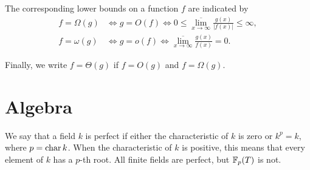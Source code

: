 The corresponding lower bounds on a function $f$ are indicated by 
\[
\begin{aligned}
f = \Omega(g) &\Longleftrightarrow g = O(f)  \Longleftrightarrow 
0 \le \overline{\lim_{x\rightarrow \infty}} \frac{g(x)}{|f(x)|} \le \infty,\\
f = \omega(g) &\Longleftrightarrow g = o(f) \Longleftrightarrow 
\overline{\lim_{x\rightarrow \infty}} \frac{g(x)}{f(x)} = 0.
\end{aligned}
\]

Finally, we write $f = \Theta(g)$ if $f = O(g)$ and $f = \Omega(g)$.

\section{Algebra}
\label{Back:Algebra:Sec}

We say that a field $k$ is perfect if either the characteristic of $k$
is zero or $k^p = k$, where $p = \mathop{\rm char}\nolimits k$.  When the characteristic of
$k$ is positive, this means that every element of $k$ has a $p$-th
root.  All finite fields are perfect, but $\mathbb{F}_p(T)$ is not.




